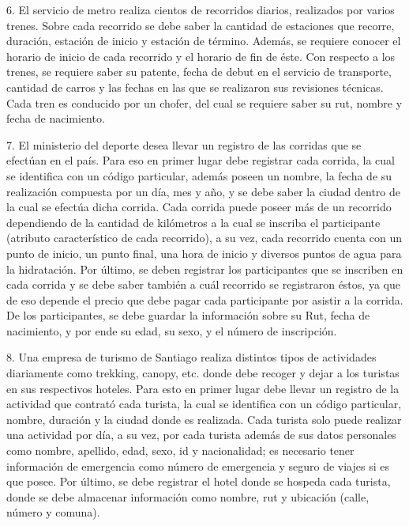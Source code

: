 \documentclass[letterpaper]{article}
\begin{document}
6. El servicio de metro realiza cientos de recorridos diarios, realizados por varios trenes. Sobre cada recorrido se debe saber la cantidad de estaciones que recorre, duración, estación de inicio y estación de término. Además, se requiere conocer el horario de inicio de cada recorrido y el horario de fin de éste. Con respecto a los trenes, se requiere saber su patente, fecha de debut en el servicio de transporte, cantidad de carros y las fechas en las que se realizaron sus revisiones técnicas. Cada tren es conducido por un chofer, del cual se requiere saber su rut, nombre y fecha de nacimiento.

7. El ministerio del deporte desea llevar un registro de las corridas que se efectúan en el país. Para eso en primer lugar debe registrar cada corrida, la cual se identifica con un código particular, además poseen un nombre, la fecha de su realización compuesta por un día, mes y año, y se debe saber la ciudad dentro de la cual se efectúa dicha corrida. Cada corrida puede poseer más de un recorrido dependiendo de la cantidad de kilómetros a la cual se inscriba el participante (atributo característico de cada recorrido), a su vez, cada recorrido cuenta con un punto de inicio, un punto final, una hora de inicio y diversos puntos de agua para la hidratación. Por último, se deben registrar los participantes que se inscriben en cada corrida y se debe saber también a cuál recorrido se registraron éstos, ya que de eso depende el precio que debe pagar cada participante por asistir a la corrida. De los participantes, se debe guardar la información sobre su Rut, fecha de nacimiento, y por ende su edad, su sexo, y el número de inscripción.

8. Una empresa de turismo de Santiago realiza distintos tipos de actividades diariamente como trekking, canopy, etc. donde debe recoger y dejar a los turistas en sus respectivos hoteles. Para esto en primer lugar debe llevar un registro de la actividad que contrató cada turista, la cual se identifica con un código particular, nombre, duración y la ciudad donde es realizada. Cada turista solo puede realizar una actividad por día, a su vez, por cada turista además de sus datos personales como nombre, apellido, edad, sexo, id y nacionalidad; es necesario tener información de emergencia como número de emergencia y seguro de viajes si es que posee. Por último, se debe registrar el hotel donde se hospeda cada turista, donde se debe almacenar información como nombre, rut y ubicación (calle, número y comuna).
\end{document}
